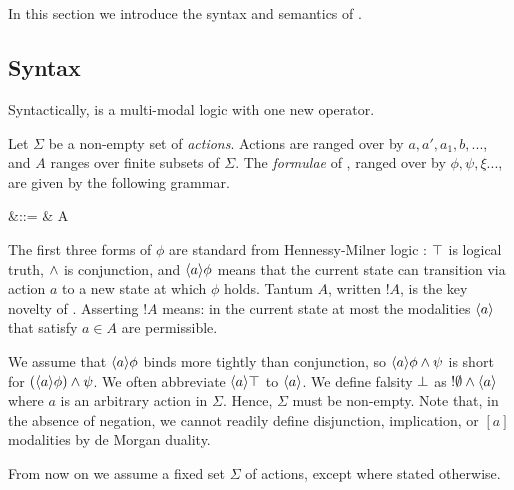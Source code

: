 \section{\Cathoristic{}}\label{coreEL}

In this section we introduce the syntax and semantics of \cathoristic{}.

\subsection{Syntax}
\label{elsyntax}
\NI Syntactically, \cathoristic{} is a multi-modal logic with one new
operator.

\begin{definition} Let $\Sigma$ be a non-empty set of \emph{actions}.
Actions are ranged over by $a, a', a_1, b, ...$, and $A$ ranges over
finite subsets of $\Sigma$. The \emph{formulae} of \cathoristic{}, ranged over by $\phi,
\psi, \xi ...$, are given by the
following grammar.

\begin{GRAMMAR}
  \phi 
     &\quad ::= \quad & 
  \TRUE 
     \VERTICAL 
  \phi \AND \psi
     \VERTICAL 
     \VERTICAL 
  \fBang A 
\end{GRAMMAR}
\end{definition}

\NI The first three forms of $\phi$ are standard from Hennessy-Milner
logic \cite{HennessyM:alglawfndac}: $\top$ is logical truth, $\land$
is conjunction, and $\langle a \rangle \phi$ means that the current state can
transition via action $a$ to a new state at which $\phi$ holds. Tantum
$A$, written $!A$, is the key novelty of \cathoristic{}.  Asserting
$!A$ means: in the current state at most the modalities $\langle a \rangle$
that satisfy $a \in A$ are permissible.

We assume that $\langle a \rangle \phi$ binds more tightly than conjunction, so
$\langle a \rangle \phi \land \psi$ is short for $(\langle a \rangle \phi) \land \psi$.
We often abbreviate $\langle a \rangle \top$ to $\langle a \rangle$. We define falsity
$\bot$ as $!\emptyset \land \langle a \rangle$ where $a$ is an arbitrary
action in $\Sigma$. 
Hence, $\Sigma$ must be
non-empty. 
Note that, in the absence of negation, we cannot
readily define disjunction, implication, or $[a]$ modalities by de
Morgan duality. 

\begin{convention}
From now on we assume a fixed set $\Sigma$ of actions, except where
stated otherwise.
\end{convention}

